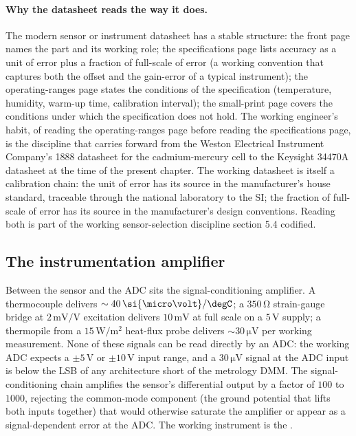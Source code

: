 \paragraph{Why the datasheet reads the way it does.} The modern
sensor or instrument datasheet has a stable structure: the front
page names the part and its working role; the specifications page
lists accuracy as a unit of error plus a fraction of full-scale of
error (a working convention that captures both the offset and the
gain-error of a typical instrument); the operating-ranges page
states the conditions of the specification (temperature, humidity,
warm-up time, calibration interval); the small-print page covers
the conditions under which the specification does not hold. The
working engineer's habit, of reading the operating-ranges page
before reading the specifications page, is the discipline that
carries forward from the Weston Electrical Instrument Company's
1888 datasheet for the cadmium-mercury cell to the Keysight 34470A
datasheet at the time of the present chapter. The working datasheet
is itself a calibration chain: the unit of error has its source in
the manufacturer's house standard, traceable through the national
laboratory to the SI; the fraction of full-scale of error has its
source in the manufacturer's design conventions. Reading both is
part of the working sensor-selection discipline section 5.4
codified.

\subsection{The instrumentation amplifier}

Between the sensor and the ADC sits the signal-conditioning
amplifier. A thermocouple delivers $\sim 40 \,\si{\micro\volt}/
\degC$; a $350 \,\si{\ohm}$ strain-gauge bridge at
$2 \,\si{\milli\volt}/\si{\volt}$ excitation delivers
$10 \,\si{\milli\volt}$ at full scale on a $5 \,\si{\volt}$ supply;
a thermopile from a $15 \,\si{\watt\per\meter\squared}$ heat-flux
probe delivers $\sim 30 \,\si{\micro\volt}$ per working measurement.
None of these signals can be read directly by an ADC: the working
ADC expects a $\pm 5 \,\si{\volt}$ or $\pm 10 \,\si{\volt}$ input
range, and a $30 \,\si{\micro\volt}$ signal at the ADC input is
below the LSB of any architecture short of the metrology DMM. The
signal-conditioning chain amplifies the sensor's differential output
by a factor of $100$ to $1000$, rejecting the common-mode component
(the ground potential that lifts both inputs together) that would
otherwise saturate the amplifier or appear as a signal-dependent
error at the ADC. The working instrument is the
.

